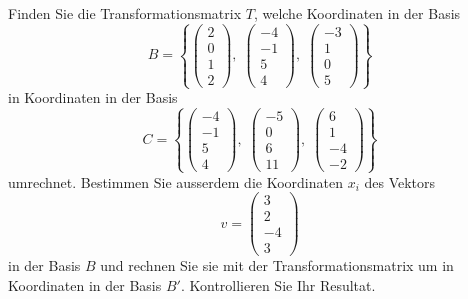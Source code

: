 Finden Sie die Transformationsmatrix $T$, welche Koordinaten in der Basis
\[
B=\left\{
\begin{pmatrix}
2\\0\\1\\2
\end{pmatrix},\;
\begin{pmatrix}
-4\\-1\\5\\4
\end{pmatrix},\;
\begin{pmatrix}
-3\\1\\0\\5
\end{pmatrix}
\right\}
\]
in Koordinaten in der Basis
\[
C=\left\{
\begin{pmatrix}
-4\\-1\\5\\4
\end{pmatrix},\;
\begin{pmatrix}
-5\\0\\6\\11
\end{pmatrix},\;
\begin{pmatrix}
6\\1\\-4\\-2
\end{pmatrix}
\right\}
\]
umrechnet.
Bestimmen Sie ausserdem die Koordinaten $x_i$ des Vektors 
\[
v
=
\begin{pmatrix}
3\\2\\-4\\3
\end{pmatrix}
\]
in der Basis $B$ und rechnen Sie sie mit der Transformationsmatrix um in
Koordinaten in der Basis $B'$. Kontrollieren Sie Ihr Resultat.


